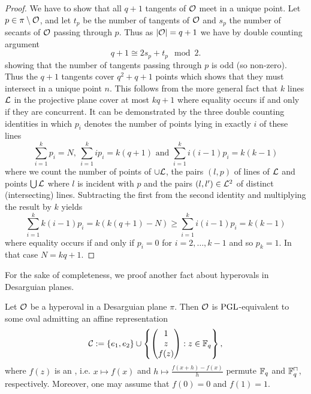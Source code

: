 \begin{proof}
    We have to show that all $q+1$ tangents of $\mathcal{O}$ meet in a unique point. Let $p\in\pi\setminus\mathcal{O}$, and let $t_p$ be the number of tangents of $\mathcal{O}$ and $s_p$ the number of secants of $\mathcal{O}$ passing through $p$. Thus as $\left|\mathcal{O}\right|=q+1$ we have by double counting argument
    $$
    q+1 \cong 2s_p+t_p \mod 2.
    $$
    showing that the number of tangents passing through $p$ is odd (so non-zero). Thus the $q+1$ tangents cover $q^2+q+1$ points which shows that they must intersect in a unique point $n$. This follows from the more general fact that $k$ lines $\mathcal{L}$ in the projective plane cover at most $kq+1$ where equality occurs if and only if they are concurrent. It can be demonstrated by the three double counting identities in which $p_i$ denotes the number of points lying in exactly $i$ of these lines
    $$
    \sum_{i=1}^k{p_i}=N,\
    \sum_{i=1}^k{ip_i}=k(q+1)\textrm{ and }\sum_{i=1}^k{i(i-1)p_i}=k(k-1)
    $$
    where we count the number of points of $\cup\mathcal{L}$, the pairs $(l,p)$ of lines of $\mathcal{L}$ and points $\bigcup\mathcal{L}$ where $l$ is incident with $p$ and the pairs $(l,l')\in\mathcal{L}^2$ of distinct (intersecting) lines.
    Subtracting the first from the second identity and multiplying the result by $k$ yields
    $$
    \sum_{i=1}^k{k(i-1)p_i}=k(k(q+1)-N)\geq \sum_{i=1}^k{i(i-1)p_i}=k(k-1)
    $$
    where equality occurs if and only if $p_i=0$ for $i=2,\ldots,k-1$ and so $p_k=1$. In that case $N=kq+1$.
\end{proof}%

For the sake of completeness, we proof another fact about hyperovals in Desarguian planes.

\begin{lemma}
    Let $\mathcal{O}$ be a hyperoval in a Desarguian plane $\pi$. Then $\mathcal{O}$ is $\mathrm{PGL}$-equivalent to some oval admitting an affine representation
    $$
    \mathcal{C}:=\left\{e_1,e_2\right\}\cup\left\{\begin{pmatrix} 1\\ z\\ f(z)\end{pmatrix}:z\in\mathbb{F}_{q}\right\},
    $$
    where $f(z)$ is an , i.e. $x\mapsto f(x)$ and $h\mapsto\frac{f(x+h)-f(x)}{h}$ permute $\mathbb{F}_{q}$ and $\units{\field{q}}$, respectively.
    Moreover, one may assume that $f(0)=0$ and $f(1)=1$.
\end{lemma}

